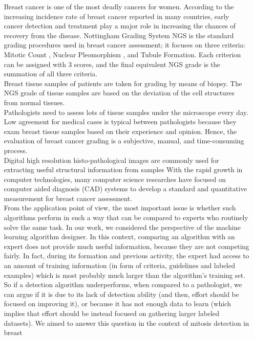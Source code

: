 Breast cancer is one of the most deadly cancers for women. According to the increasing incidence rate of breast
cancer reported in many countries, early cancer detection and treatment play a major role
in increasing the chances of recovery from the disease. Nottingham Grading
System \Gls{NGS} is the standard grading procedures used in breast cancer assessment;
it focuses on three criteria: Mitotic Count , Nuclear Pleomorphism , and
Tubule Formation. Each criterion can be assigned with 3 scores, and the final
equivalent NGS grade is the summation of all three criteria.\\
Breast tissue samples of patients are taken for grading by means of biopsy. The \Gls{NGS} grade
of tissue samples are based on the deviation of the cell structures from normal
tissues.\\
Pathologists need to assess lots of tissue samples under the microscope every day.
Low agreement for medical cases is typical between pathologists
because they exam breast tissue samples based on their experience and opinion.
Hence, the evaluation of breast cancer grading is a subjective, manual, and
time-consuming process.\\
Digital high resolution histo-pathological images are commonly used for extracting useful structural information from samples
With the rapid growth in computer technologies, many computer science researches have
focused on computer aided diagnosis (\Gls{CAD}) systems to develop a standard and
quantitative measurement for breast cancer assessment.\\
From the application point of view, the most important issue is whether such algorithms
perform in such a way that can be compared to experts who routinely solve the same task.
In our work, we considered the perspective of the machine learning algorithm designer.
In this context, comparing an algorithm with an expert does not provide
much useful information, because they are not competing fairly. In fact, during
its formation and previous activity, the expert had access to an amount of training information (in form of criteria, guidelines and labeled examples) which is
most probably much larger than the algorithm's training set. So if a detection algorithm underperforms, when compared to a pathologist,
we can argue if it is due to its lack of detection ability (and then, effort should be
focused on improving it), or because it has not enough data to learn (which implies that effort should be instead focused on gathering larger labeled datasets).
We aimed to answer this question in the context of mitosis detection in breast
